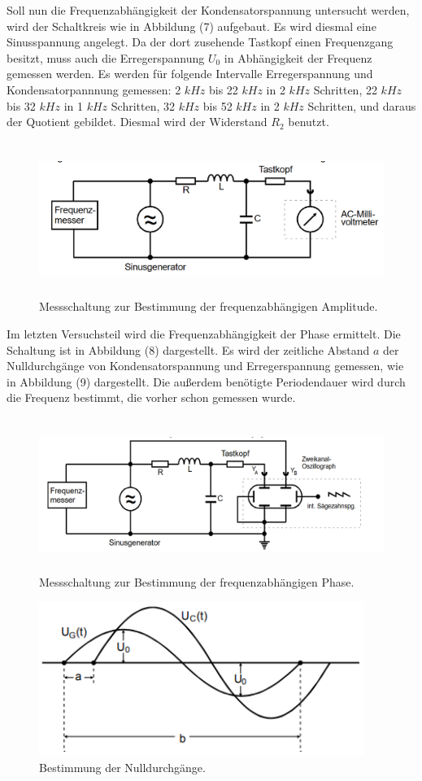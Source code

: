 \noindent Soll nun die Frequenzabhängigkeit der Kondensatorspannung untersucht werden, wird der Schaltkreis wie in Abbildung (7) aufgebaut.
Es wird diesmal eine Sinusspannung angelegt. Da der dort zusehende Tastkopf einen Frequenzgang besitzt, muss auch die Erregerspannung $U_0$ in Abhängigkeit der Frequenz gemessen werden.
Es werden für folgende Intervalle Erregerspannung und Kondensatorpannnung gemessen: 2 $kHz$ bis 22 $kHz$ in 2 $kHz$ Schritten, 22 $kHz$ bis 32 $kHz$ in 1 $kHz$ Schritten,
32 $kHz$ bis 52 $kHz$ in 2 $kHz$ Schritten, und daraus der Quotient gebildet. Diesmal wird der Widerstand  $R_2$ benutzt.
\begin{figure}[H]
  \centering
  \includegraphics[height=5cm]{Schaltung3.png}
  \caption{Messschaltung zur Bestimmung der frequenzabhängigen Amplitude. \cite[S. 13]{kent}}
\end{figure}


\noindent Im letzten Versuchsteil wird die Frequenzabhängigkeit der Phase ermittelt. Die Schaltung ist in Abbildung (8) dargestellt.
Es wird der zeitliche Abstand $a$ der Nulldurchgänge von Kondensatorspannung und Erregerspannung gemessen, wie in Abbildung (9) dargestellt.
Die außerdem benötigte Periodendauer wird durch die Frequenz bestimmt, die vorher schon gemessen wurde.
\begin{figure}[H]
  \centering
  \includegraphics[height=5cm]{Schaltung4.png}
  \caption{Messschaltung zur Bestimmung der frequenzabhängigen Phase. \cite[S. 13]{kent}}
\end{figure}
\begin{figure}[H]
  \centering
  \includegraphics[height=5cm]{phi.png}
  \caption{Bestimmung der Nulldurchgänge. \cite[S. 7]{l}}
\end{figure}

